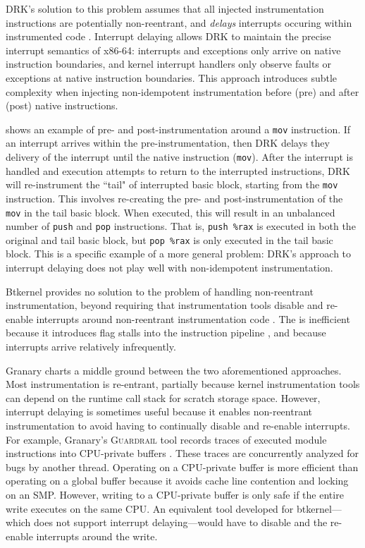 \documentclass[preprint]{sigplanconf}
\newcommand{\toolname}[1]{{\scshape #1}}
\begin{document}
DRK's solution to this problem assumes that all injected instrumentation instructions are potentially non-reentrant, and \emph{delays} interrupts occuring within instrumented code \cite{DRK}. Interrupt delaying allows DRK to maintain the precise interrupt semantics of x86-64: interrupts and exceptions only arrive on native instruction boundaries, and kernel interrupt handlers only observe faults or exceptions at native instruction boundaries. This approach introduces subtle complexity when injecting non-idempotent instrumentation before (pre) and after (post) native instructions.

 shows an example of pre- and post-instrumentation around a \texttt{mov} instruction. If an interrupt arrives within the pre-instrumentation, then DRK delays they delivery of the interrupt until the native instruction (\texttt{mov}). After the interrupt is handled and execution attempts to return to the interrupted instructions, DRK will re-instrument the ``tail" of interrupted basic block, starting from the \texttt{mov} instruction. This involves re-creating the pre- and post-instrumentation of the \texttt{mov} in the tail basic block. When executed, this will result in an unbalanced number of \texttt{push} and \texttt{pop} instructions. That is, \texttt{push \%rax} is executed in both the original and tail basic block, but \texttt{pop \%rax} is only executed in the tail basic block. This is a specific example of a more general problem: DRK's approach to interrupt delaying does not play well with non-idempotent instrumentation.

Btkernel provides no solution to the problem of handling non-reentrant instrumentation, beyond requiring that instrumentation tools disable and re-enable interrupts around non-reentrant instrumentation code \cite{btkernel}. The is inefficient because it introduces flag stalls into the instruction pipeline \cite{AgnerMicroarchitecture}, and because interrupts arrive relatively infrequently.

Granary charts a middle ground between the two aforementioned approaches. Most instrumentation is re-entrant, partially because kernel instrumentation tools can depend on the runtime call stack for scratch storage space. However, interrupt delaying is sometimes useful because it enables non-reentrant instrumentation to avoid having to continually disable and re-enable interrupts. For example, Granary's \toolname{Guardrail} tool records traces of executed module instructions into CPU-private buffers \cite{Guardrail}. These traces are concurrently analyzed for bugs by another thread. Operating on a CPU-private buffer is more efficient than operating on a global buffer because it avoids cache line contention and locking on an SMP. However, writing to a CPU-private buffer is only safe if the entire write executes on the same CPU. An equivalent tool developed for btkernel---which does not support interrupt delaying---would have to disable and the re-enable interrupts around the write. 
\end{document}
